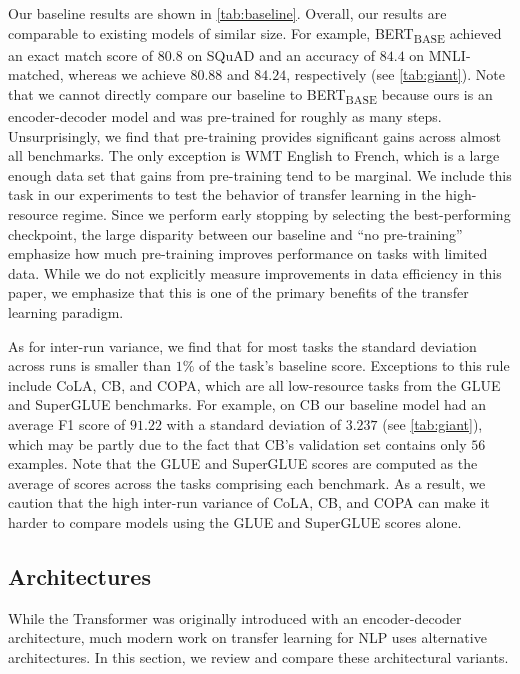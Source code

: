 Our baseline results are shown in \ref{tab:baseline}.
Overall, our results are comparable to existing models of similar size. For example, BERT\textsubscript{BASE} achieved an exact match score of $80.8$ on SQuAD and an accuracy of $84.4$ on MNLI-matched, whereas we achieve $80.88$ and $84.24$, respectively (see \ref{tab:giant}).
Note that we cannot directly compare our baseline to BERT\textsubscript{BASE} because ours is an encoder-decoder model and was pre-trained for roughly  as many steps. Unsurprisingly, we find that pre-training provides significant gains across almost all benchmarks. The only exception is WMT English to French, which is a large enough data set that gains from pre-training tend to be marginal. We include this task in our experiments to test the behavior of transfer learning in the high-resource regime. Since we perform early stopping by selecting the best-performing checkpoint, the large disparity between our baseline and ``no pre-training'' emphasize how much pre-training improves performance on tasks with limited data. While we do not explicitly measure improvements in data efficiency in this paper, we emphasize that this is one of the primary benefits of the transfer learning paradigm.

As for inter-run variance, we find that for most tasks the standard deviation across runs is smaller than $1\%$ of the task's baseline score. Exceptions to this rule include CoLA, CB, and COPA, which are all low-resource tasks from the GLUE and SuperGLUE benchmarks. For example, on CB our baseline model had an average F1 score of $91.22$ with a standard deviation of $3.237$ (see \ref{tab:giant}), which may be partly due to the fact that CB's validation set contains only $56$ examples. Note that the GLUE and SuperGLUE scores are computed as the average of scores across the tasks comprising each benchmark. As a result, we caution that the high inter-run variance of CoLA, CB, and COPA can make it harder to compare models using the GLUE and SuperGLUE scores alone.

\subsection{Architectures}
\label{sec:architectures}

While the Transformer was originally introduced with an encoder-decoder architecture, much modern work on transfer learning for NLP uses alternative architectures. In this section, we review and compare these architectural variants.

